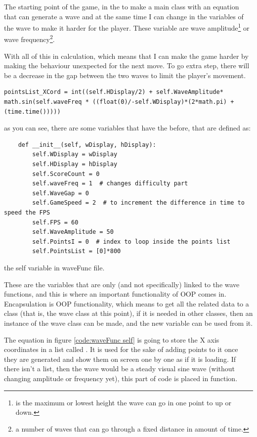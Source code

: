 The starting point of the game, in the  to make a main class  with an equation that can generate a wave and at the same time I can change in the variables of the wave to make it harder for the player. These variable are wave amplitude\footnote{is the maximum or lowest height the wave can go in one point to up or down.} or wave frequency\footnote{a number of waves that can go through a fixed distance in amount of time.}.

With all of this in calculation, which means that I can make the game harder by making the behaviour unexpected for the next move. To go extra step, there will be a decrease in the gap between the two waves to limit the player's movement.

\begin{verbatim}
pointsList_XCord = int((self.HDisplay/2) + self.WaveAmplitude* math.sin(self.waveFreq * ((float(0)/-self.WDisplay)*(2*math.pi) + (time.time()))))
\end{verbatim}
as you can see, there are some variables that have the  before, that are defined as:

\begin{listing}[!ht]
\begin{verbatim}
	def __init__(self, wDisplay, hDisplay):
		self.WDisplay = wDisplay
		self.HDisplay = hDisplay
		self.ScoreCount = 0  
		self.waveFreq = 1  # changes difficulty part
		self.WaveGap = 0
		self.GameSpeed = 2  # to increment the difference in time to speed the FPS
		self.FPS = 60
		self.WaveAmplitude = 50
		self.PointsI = 0  # index to loop inside the points list
		self.PointsList = [0]*800
\end{verbatim}
\caption{the self variable in waveFunc file.}
\label{code:waveFunc self}
\end{listing}


These are the variables that are only (and not specifically) linked to the wave functions, and this is where an important functionality of OOP comes in. Encapsulation is OOP functionality, which means to get all the related data to a class (that is, the wave class at this point), if it is needed in other classes, then an instance of the wave class can be made, and the new variable can be used from it.

The equation in figure \ref{code:waveFunc self} is going to store the X axis coordinates in a list called . It is used for the sake of adding points to it once they are generated and show them on screen one by one as if it is loading. If there isn't a list, then the wave would be a steady visual sine wave (without changing amplitude or frequency yet), this part of code is placed in  function.

